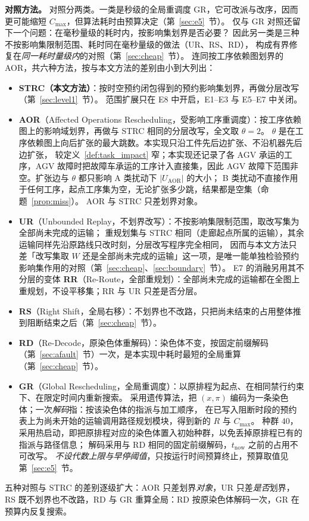 \documentclass[manuscript,screen,review]{acmart}
\providecommand{\STRC}{\textsc{STRC}}
\begin{document}
\textbf{对照方法。}
\label{sec:vs_r0}
对照分两类。一类是秒级的全局重调度 GR，它可改派与改序，因而更可能缩短 \(C_{\max}\)，但算法耗时由预算决定（第~\ref{sec:e5}~节）。
仅与 GR 对照还留下一个问题：在毫秒量级的耗时内，按影响集划界是否必要？
因此另一类是三种不按影响集限制范围、耗时同在毫秒量级的做法（UR、RS、RD），
构成有界修复在\emph{同一耗时量级内}的对照（第~\ref{sec:cheap}~节）。
连同按工序依赖图划界的 AOR，共六种方法，按与本文方法的差别由小到大列出：
\begin{itemize}[leftmargin=1.5em,itemsep=0.2em]
\item \textbf{\STRC{}（本文方法）}：按时空预约闭包得到的预约影响集划界，再做分层改写（第~\ref{sec:level1}~节）。
范围扩展只在 E8 中开启，E1--E3 与 E5--E7 中关闭。
\item \textbf{AOR}（Affected Operations Rescheduling，受影响工序重调度）：按工序依赖图上的影响域划界，再做与 \STRC{} 相同的分层改写，全文取 \(\theta=2\)。
\(\theta\) 是在工序依赖图上向后扩张的最大跳数。本实现只沿工件先后边扩张、不沿机器先后边扩张，
较定义~\ref{def:task_impact} 窄；本实现还记录了各 AGV 承运的工序，AGV 故障时把故障车承运的工序计入直接集，因此 AGV 故障下范围非空。扩张边与 \(\theta\) 都只影响 A 类扰动下 \(|U_{\mathrm{AOR}}|\) 的大小；
B 类扰动不直接作用于任何工序，起点工序集为空，无论扩张多少跳，结果都是空集（命题~\ref{prop:miss}）。
AOR 与 \STRC{} 只差划界对象。
\item \textbf{UR}（Unbounded Replay，不划界改写）：不按影响集限制范围，取改写集为全部尚未完成的运输；
重规划集与 \STRC{} 相同（走廊起点所属的运输），其余运输同样先沿原路线只改时刻，分层改写程序完全相同，
因而与本文方法只差「改写集取 \(W\) 还是全部尚未完成的运输」这一项，是唯一能单独检验预约影响集作用的对照（第~\ref{sec:cheap}、\ref{sec:boundary}~节）。
E7 的消融另用其不分层的变体 \textbf{RR}（Re-Route，全部重规划）：全部尚未完成的运输都在全图上重规划，不设平移集；RR 与 UR 只差是否分层。
\item \textbf{RS}（Right Shift，全局右移）：不划界也不改路，只把尚未结束的占用整体推到阻断结束之后（第~\ref{sec:cheap}~节）。
\item \textbf{RD}（Re-Decode，原染色体重解码）：染色体不变，按固定前缀解码（第~\ref{sec:afault}~节）一次，是本实现中耗时最短的全局重算（第~\ref{sec:cheap}~节）。
\item \textbf{GR}（Global Rescheduling，全局重调度）：以原排程为起点、在相同禁行约束下、在限定时间内重新搜索。
采用遗传算法，把 \((x,\pi)\) 编码为一条染色体；一次\emph{解码}指：按该染色体的指派与加工顺序，
在已写入阻断时段的预约表上为尚未开始的运输调用路径规划模块，得到新的 \(R\) 与 \(C_{\max}\)。
种群 \(40\)，采用热启动，即把原排程对应的染色体置入初始种群，以免丢掉原排程已有的指派与路径信息；
解码采用与 RD 相同的固定前缀解码，\(t_{\mathrm{now}}\) 之前的占用不可改写。
\emph{不设代数上限与早停阈值}，只按运行时间预算终止，预算取值见第~\ref{sec:e5}~节。
\end{itemize}
五种对照与 \STRC{} 的差别逐级扩大：AOR 只差划界\emph{对象}，UR 只差\emph{是否}划界，
RS 既不划界也不改路，RD 与 GR 重算全局：RD 按原染色体解码一次，GR 在预算内反复搜索。
\end{document}
